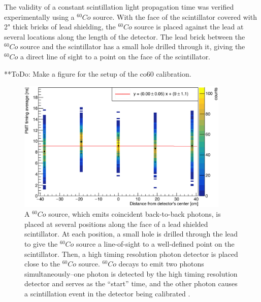 The validity of a constant scintillation light propagation time was verified experimentally using a $^{60}Co$ source. With the face of the scintillator covered with 2" thick bricks of lead shielding, the $^{60}Co$ source is placed against the lead at several locations along the length of the detector. The lead brick between the $^{60}Co$ source and the scintillator has a small hole drilled through it, giving the $^{60}Co$ a direct line of sight to a point on the face of the scintillator.  

**ToDo: Make a figure for the setup of the co60 calibration. 

\begin{figure}
    \centering
    \includegraphics[width = 0.9\textwidth]{Content/Methods/CO60Validation.png}
    \caption{A $^{60}Co$ source, which emits coincident back-to-back photons, is placed at several positions along the face of a lead shielded scintillator. At each position, a small hole is drilled through the lead to give the $^{60}Co$ source a line-of-sight to a well-defined point on the scintillator. Then, a high timing resolution photon detector is placed close to the $^{60}Co$ source. $^{60}Co$ decays to emit two photons simultaneously--one photon is detected by the high timing resolution detector and serves as the ``start'' time, and the other photon causes a scintillation event in the detector being calibrated .}
    \label{fig:Co60Validation}
\end{figure}

